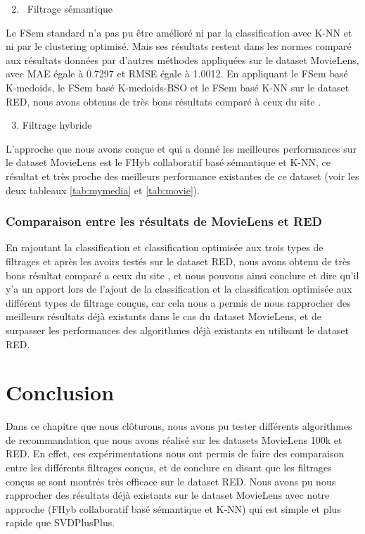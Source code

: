 \begin{enumerate}[nosep,label=\textbf{\arabic*)}]
	\setcounter{enumi}{1}
	\item \ Filtrage sémantique
\end{enumerate}\mbox{} \indent
Le FSem standard n'a pas pu être amélioré ni par la classification avec K-NN et ni par le clustering optimisé. Mais ses résultats restent dans les normes comparé aux résultats données par d'autres méthodes appliquées sur le dataset MovieLens, avec MAE égale à 0.7297 et RMSE égale à 1.0012.
En appliquant le FSem basé K-medoids, le FSem basé K-medoids-BSO et le FSem basé K-NN sur le dataset RED, nous avons obtenus de très bons résultats comparé à ceux du site \cite{ref43}.\\

\begin{enumerate}[nosep,label=\textbf{\arabic*)}]
	\setcounter{enumi}{2}
	\item Filtrage hybride
\end{enumerate}\mbox{} \indent
L'approche que nous avons conçue et qui a donné les meilleures performances sur le dataset MovieLens est le FHyb collaboratif basé sémantique et K-NN, ce résultat et très proche des meilleurs performance existantes de ce dataset (voir les deux tableaux \ref{tab:mymedia} et \ref{tab:movie}).

\subsubsection*{Comparaison entre les résultats de MovieLens et RED}
En rajoutant la classification et classification optimisée aux trois types de filtrages et après les avoirs testés sur le dataset RED, nous avons obtenu de très bons résultat comparé a ceux du site \cite{ref43}, et nous pouvons ainsi conclure et dire qu'il y'a un apport lors de l'ajout de la classification et la classification optimisée aux  différent types de filtrage conçus, car cela nous a permis de nous rapprocher des meilleurs résultats déjà existants dans le cas du dataset MovieLens, et de surpasser les performances des algorithmes déjà existants en utilisant le dataset RED.
\section{Conclusion}
Dans ce chapitre que nous clôturons, nous avons pu tester différents algorithmes
de recommandation que nous avons réalisé sur les datasets MovieLens 100k et RED.
En effet, ces expérimentations nous ont permis de faire des comparaison entre les différents filtrages conçus, et de conclure en disant que les filtrages conçus se sont montrés très efficace sur le dataset RED. Nous avons pu nous rapprocher des résultats déjà existants sur le dataset MovieLens avec notre approche (FHyb collaboratif basé sémantique et K-NN) qui est simple et plus rapide que SVDPlusPlus.  

\newpage

